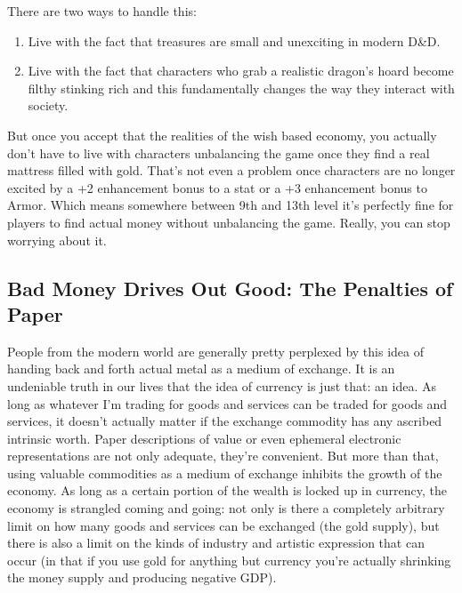 There are two ways to handle this:
\begin{enumerate}\itemspace
   \item Live with the fact that treasures are small and unexciting in modern D\&D.
   \item Live with the fact that characters who grab a realistic dragon's hoard become filthy stinking rich and this fundamentally changes the way they interact with society.
\end{enumerate}


But once you accept that the realities of the wish based economy, you actually don't have to live with characters unbalancing the game once they find a real mattress filled with gold. That's not even a problem once characters are no longer excited by a +2 enhancement bonus to a stat or a +3 enhancement bonus to Armor. Which means somewhere between 9th and 13th level it's perfectly fine for players to find actual money without unbalancing the game. Really, you can stop worrying about it.

\subsection{Bad Money Drives Out Good: The Penalties of Paper}

People from the modern world are generally pretty perplexed by this idea of handing back and forth actual metal as a medium of exchange. It is an undeniable truth in our lives that the idea of currency is just that: an idea. As long as whatever I'm trading for goods and services can be traded for goods and services, it doesn't actually matter if the exchange commodity has any ascribed intrinsic worth. Paper descriptions of value or even ephemeral electronic representations are not only adequate, they're convenient. But more than that, using valuable commodities as a medium of exchange inhibits the growth of the economy. As long as a certain portion of the wealth is locked up in currency, the economy is strangled coming and going: not only is there a completely arbitrary limit on how many goods and services can be exchanged (the gold supply), but there is also a limit on the kinds of industry and artistic expression that can occur (in that if you use gold for anything but currency you're actually shrinking the money supply and producing negative GDP).

